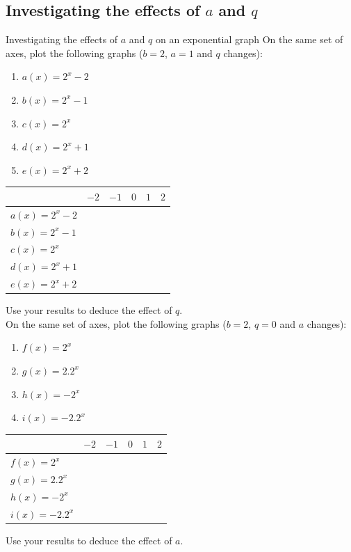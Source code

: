 \subsection*{Investigating the effects of $a$ and $q$}
\begin{Investigation}{Investigating the effects of $a$ and $q$ on an exponential graph}
On the same set of axes, plot the following graphs ($b=2$, $a=1$ and $q$ changes):
\begin{enumerate}[noitemsep, label=\textbf{\alph*}. ] 
\item $a(x)=2^{x}-2$
\item $b(x)=2^{x}-1$
\item $c(x)=2^{x}$
\item $d(x)=2^{x}+1$
\item $e(x)=2^{x}+2$
\end{enumerate}

\begin{table}[H]
\begin{center}
\begin{tabular}{|l|c|c|c|c|c|}
\hline
   &  $-2$ & $-1$ & $0$ & $1$ & $2$ 
\\ \hline
$a(x)=2^{x}-2$&  &&&&
\\ \hline
 $b(x)=2^{x}-1$&  &&&&
\\ \hline
$c(x)=2^{x}$&  &&&&
\\ \hline
$d(x)=2^{x}+1$&  &&&&
\\ \hline
$e(x)=2^{x}+2$&  &&&&
\\ \hline
\end{tabular}
\end{center}
\end{table}
Use your results to deduce the effect of $q$.
\\

On the same set of axes, plot the following graphs ($b=2$, $q=0$ and $a$ changes):
\begin{enumerate}[noitemsep, label=\textbf{\arabic*}. ] 
\item $f(x)=2^{x}$
\item $g(x)=2.2^{x}$
\item $h(x)=-2^{x}$
\item $i(x)=-2.2^{x}$
\end{enumerate}

\begin{table}[H]
\begin{center}
\begin{tabular}{|l|c|c|c|c|c|}
\hline
   &  $-2$ & $-1$ & $0$ & $1$ & $2$ 
\\ \hline
$f(x)=2^{x}$&  &&&&
\\ \hline
$g(x)=2.2^{x}$&  &&&&
\\ \hline
 $h(x)=-2^{x}$&  &&&&
\\ \hline
$i(x)=-2.2^{x}$&  &&&&
\\ \hline

\end{tabular}
\end{center}
\end{table}
Use your results to deduce the effect of $a$.
\end{Investigation}


